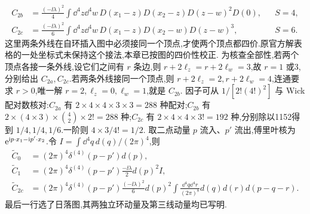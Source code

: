 \begin{solution}
\begin{align*}
C_{2b}&=\frac{(-\ii\lambda)^2}{4}\int\dd^4z\dd^4w\,D(x_1-z)D(x_2-z)D(z-w)^2D(0),&&S=4,\\
C_{2c}&=\frac{(-\ii\lambda)^2}{6}\int\dd^4z\dd^4w\,D(x_1-z)D(x_2-w)D(z-w)^3,&&S=6.
\end{align*}
这里两条外线在自环插入图中必须接同一个顶点,才使两个顶点都四价.原官方解表格的一处坐标式未保持这个接法,本章已按图的四价性校正.
为核查全部性,若两个顶点各接一条外线,设它们之间有 $r$ 条边,则 $r+2\ell_z=r+2\ell_w=3$,故 $r=1$ 或3,分别给出 $C_{2a},C_{2c}$.若两条外线接同一个顶点,则 $r+2\ell_z=2,r+2\ell_w=4$,连通要求 $r>0$,唯一解 $r=2,\ell_z=0,\ell_w=1$,就是 $C_{2b}$.
因子可从 $1/[2!(4!)^2]$ 与 Wick 配对数核对:$C_{2a}$ 有 $2\times4\times4\times3\times3=288$ 种配对;$C_{2b}$ 有 $2\times(4\times3)\times\binom42\times2!=288$ 种;$C_{2c}$ 有 $2\times4\times4\times3!=192$ 种,分别除以1152得到 $1/4,1/4,1/6$.一阶则 $4\times3/4!=1/2$.
取二点动量 $p$ 流入、$p'$ 流出,傅里叶核为 $\mathrm e^{\mathrm i p\cdot x_1-\mathrm i p'\cdot x_2}$.令 $I=\int\dd^4q\,d(q)/(2\pi)^4$,则
\begin{align*}
\widetilde C_0&=(2\pi)^4\delta^{(4)}(p-p')d(p),\\
\widetilde C_1&=(2\pi)^4\delta^{(4)}(p-p')\frac{-\ii\lambda}{2}d(p)^2I,\\
\widetilde C_{2c}&=(2\pi)^4\delta^{(4)}(p-p')\frac{(-\ii\lambda)^2}{6}d(p)^2
\int\frac{\dd^4q\dd^4r}{(2\pi)^8}d(q)d(r)d(p-q-r).
\end{align*}
最后一行选了日落图,其两独立环动量及第三线动量均已写明.


\end{solution}
